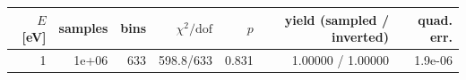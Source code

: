 \begin{tabular}{rrrrrrr}
\toprule
$E$ [eV] & samples & bins & $\chi^2/\mathrm{dof}$ & $p$ & yield (sampled / inverted) & quad. err. \\
\midrule
1 & 1e+06 & 633 & 598.8/633 & 0.831 & 1.00000 / 1.00000 & 1.9e-06 \\
\bottomrule
\end{tabular}
